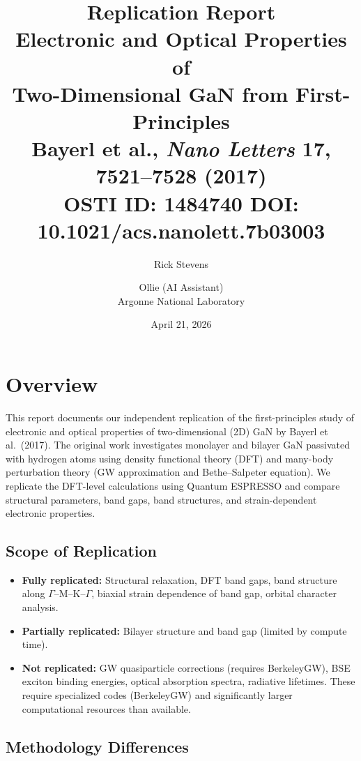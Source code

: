 \documentclass[11pt]{article}
\title{\textbf{Replication Report}\\[0.3em]
\large Electronic and Optical Properties of\\
Two-Dimensional GaN from First-Principles\\[0.3em]
\normalsize Bayerl et al., \textit{Nano Letters} \textbf{17}, 7521--7528 (2017)\\
OSTI ID: 1484740 \quad DOI: 10.1021/acs.nanolett.7b03003}
\author{Rick Stevens \and Ollie (AI Assistant)\\
Argonne National Laboratory}
\date{April 21, 2026}
\begin{document}
\maketitle
\thispagestyle{fancy}

\section{Overview}

This report documents our independent replication of the first-principles study of electronic and optical properties of two-dimensional (2D) GaN by Bayerl et al.\ (2017). The original work investigates monolayer and bilayer GaN passivated with hydrogen atoms using density functional theory (DFT) and many-body perturbation theory (GW approximation and Bethe--Salpeter equation). We replicate the DFT-level calculations using Quantum ESPRESSO and compare structural parameters, band gaps, band structures, and strain-dependent electronic properties.

\subsection{Scope of Replication}

\begin{itemize}[leftmargin=*]
    \item \textbf{Fully replicated:} Structural relaxation, DFT band gaps, band structure along $\Gamma$--M--K--$\Gamma$, biaxial strain dependence of band gap, orbital character analysis.
    \item \textbf{Partially replicated:} Bilayer structure and band gap (limited by compute time).
    \item \textbf{Not replicated:} GW quasiparticle corrections (requires BerkeleyGW), BSE exciton binding energies, optical absorption spectra, radiative lifetimes. These require specialized codes (BerkeleyGW) and significantly larger computational resources than available.
\end{itemize}

\subsection{Methodology Differences}
\end{document}
